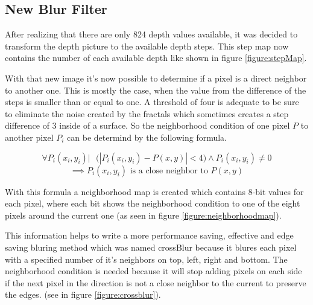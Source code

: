 


\subsection{New Blur Filter}
After realizing that there are only 824 depth values available, it was decided to transform the depth picture
to the available depth steps. This step map now contains the number of each available depth like shown in figure \vref{figure:stepMap}.


With that new image it's now possible to determine if a pixel is a direct neighbor to another one. This is mostly the case,
when the value from the difference of the steps is smaller than or equal to one. A threshold of four is adequate to be sure 
to eliminate the noise created by the fractals which sometimes creates a step difference of 3 inside of a surface. 
So the neighborhood condition of one pixel $P$ to another pixel $P_i$ can be determind by the following formula.

\[
 \forall P_i(x_i,y_i)  |\mbox{   }
 \Big(\left|P_i(x_i,y_i)-P(x,y)\right|<4 \Big) \wedge  P_i(x_i,y_i) \neq 0 %
\]
\[
 \implies P_i(x_i,y_i) \mbox{ is a close neighbor to } P(x,y)
\]

With this formula a neighborhood map is created which contains 8-bit values for each pixel, where each bit shows the neighborhood 
condition to one of the eight pixels around the current one (as seen in figure \vref{figure:neighborhoodmap}).


This information helps to write a more performance saving, effective and edge saving bluring method which 
was named crossBlur because it blures each pixel with a specified number of it's neighbors on top, left, right and bottom.
The neighborhood condition is needed because it will stop adding pixels on each side if the next pixel in the direction 
is not a close neighbor to the current to preserve the edges. (see in figure \vref{figure:crossblur}).




